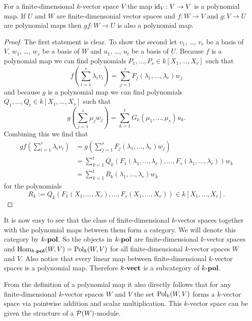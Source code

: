 \begin{lem}
 For a finite-dimensional $k$-vector space $V$ the map $\operatorname{id}_V \colon V \to V$ is a polynomial map. If $U$ and $W$ are finite-dimensonial vector spaces and $f \colon W \to V$ and $g \colon V \to U$ are polynomial maps then $gf \colon W \to U$ is also a polynomial map.
\end{lem}
\begin{proof}
 The first statement is clear. To show the second let $v_1$, \dots, $v_r$ be a basis of $V$, $w_1$, \dots, $w_s$ be a basis of $W$ and $u_1$, \dots, $u_t$ be a basis of $U$. Because $f$ is a polynomial map we can find polynomials $P_1, \dotsc, P_s \in k[X_1, \dotsc, X_r]$ such that
 \[
  f\left(\sum_{i=1}^r \lambda_i v_i\right) = \sum_{j=1}^s F_j(\lambda_1, \dotsc, \lambda_r) w_j
 \]
 and because $g$ is a polynomial map we can find polynomials $Q_1, \dotsc, Q_t \in k[X_1, \dotsc, X_s]$ such that
 \[
  g\left(\sum_{j=1}^s \mu_j w_j\right) = \sum_{k=1}^t G_k(\mu_1, \dotsc, \mu_s) u_k.
 \]
 Combining this we find that
 \begin{align*}
  gf\left(\sum_{i=1}^r \lambda_i v_i\right)
  &= g\left(\sum_{j=1}^s F_j(\lambda_1, \dotsc, \lambda_r) w_j\right) \\
  &= \sum_{k=1}^t Q_k(F_1(\lambda_1, \dotsc, \lambda_r), \dotsc, F_s(\lambda_1, \dotsc, \lambda_r)) w_k \\
  &= \sum_{k=1}^t R_k(\lambda_1, \dotsc, \lambda_r) w_k
 \end{align*}
 for the polynomials
 \[
  R_k := Q_k(F_1(X_1, \dotsc, X_r), \dotsc, F_s(X_1, \dotsc, X_r)) \in k[X_1, \dotsc, X_r].
 \]
\end{proof}


It is now easy to see that the class of finite-dimensional $k$-vector spaces together with the polynomial maps between them form a category. We will denote this category by $k\text{-}\mathbf{pol}$. So the objects in $k\text{-}\mathbf{pol}$ are finite-dimensional $k$-vector spaces and $\operatorname{Hom}_{k\text{-}\mathbf{pol}}(W,V) = \operatorname{Pol}_k(W,V)$ for all finite-dimensional $k$-vector spaces $W$ and $V$. Also notice that every linear map between finite-dimensional $k$-vector spaces is a polynomial map. Therefore $k\text{-}\mathbf{vect}$ is a subcategory of $k\text{-}\mathbf{pol}$.

From the definition of a polynomial map it also directly follows that for any finite-dimensional $k$-vector spaces $W$ and $V$ the set $\operatorname{Pol}_k(W,V)$ forms a $k$-vector space via pointwise addition and scalar multiplication. This $k$-vector space can be given the structure of a $\mathcal{P}(W)$-module.

